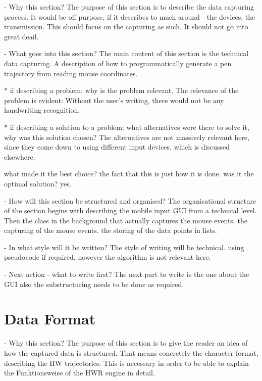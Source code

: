 - Why this section? 
  The purpose of this section is to describe the data capturing process.
  It would be off purpose, if it describes to much around - the devices, the
  transmission. This should focus on the capturing as such.
  It should not go into great deail.
  
- What goes into this section?
  The main content of this section is the technical data capturing.
  A description of how to
  programmatically generate a pen trajectory from reading mouse coordinates.
  
  * if describing a problem: why is the problem relevant.
    The relevance of the problem is evident: Without the user's writing,
    there would not be any handwriting recognition.

  * if describing a solution to a problem: what alternatives were
    there to solve it, why was this solution chosen? 
    The alternatives are not massively relevant here, since they come down
    to using different input devices, which is discussed elsewhere.

    what made it the best choice? 
    the fact that this is just how it is done.
    was it the optimal solution?
    yes.

- How will this section be structured and organised?
  The organisational structure of the section begins with describing the mobile 
  input GUI from a technical level.
  Then the class in the background that actually captures the mouse events.
  the capturing of the mouse events.
  the storing of the data points in lists.
 
- In what style will it be written?
  The style of writing will be technical. using pseudocode if required.
  however the algorithm is not relevant here.

- Next action - what to write first?
  The next part to write is the one about the GUI
  also the substructuring needs to be done as required.



\section{Data Format}
\label{sec:hwre:dataformat}

- Why this section? 
  The purpose of this section is to give the reader an idea of how the captured
  data is structured. That means concretely the character format, describing
  the HW trajectories. This is necessary in order to be able to explain the
  Funktionsweise of the HWR engine in detail.

